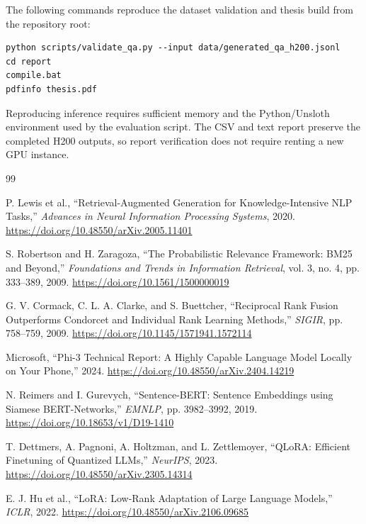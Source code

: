 \documentclass[12pt,a4paper,oneside]{report}
\begin{document}
The following commands reproduce the dataset validation and thesis build from
the repository root:
\begin{verbatim}
python scripts/validate_qa.py --input data/generated_qa_h200.jsonl
cd report
compile.bat
pdfinfo thesis.pdf
\end{verbatim}

Reproducing inference requires sufficient memory and the Python/Unsloth
environment used by the evaluation script. The CSV and text report preserve the
completed H200 outputs, so report verification does not require renting a new
GPU instance.

\newpage
\begin{thebibliography}{99}

P. Lewis et al., ``Retrieval-Augmented Generation for Knowledge-Intensive NLP
Tasks,'' \textit{Advances in Neural Information Processing Systems}, 2020.
\url{https://doi.org/10.48550/arXiv.2005.11401}

S. Robertson and H. Zaragoza, ``The Probabilistic Relevance Framework: BM25 and
Beyond,'' \textit{Foundations and Trends in Information Retrieval}, vol. 3,
no. 4, pp. 333--389, 2009.
\url{https://doi.org/10.1561/1500000019}

G. V. Cormack, C. L. A. Clarke, and S. Buettcher, ``Reciprocal Rank Fusion
Outperforms Condorcet and Individual Rank Learning Methods,'' \textit{SIGIR},
pp. 758--759, 2009. \url{https://doi.org/10.1145/1571941.1572114}

Microsoft, ``Phi-3 Technical Report: A Highly Capable Language Model Locally on
Your Phone,'' 2024. \url{https://doi.org/10.48550/arXiv.2404.14219}

N. Reimers and I. Gurevych, ``Sentence-BERT: Sentence Embeddings using Siamese
BERT-Networks,'' \textit{EMNLP}, pp. 3982--3992, 2019.
\url{https://doi.org/10.18653/v1/D19-1410}

T. Dettmers, A. Pagnoni, A. Holtzman, and L. Zettlemoyer, ``QLoRA: Efficient
Finetuning of Quantized LLMs,'' \textit{NeurIPS}, 2023.
\url{https://doi.org/10.48550/arXiv.2305.14314}

E. J. Hu et al., ``LoRA: Low-Rank Adaptation of Large Language Models,''
\textit{ICLR}, 2022. \url{https://doi.org/10.48550/arXiv.2106.09685}


\end{thebibliography}
\end{document}
